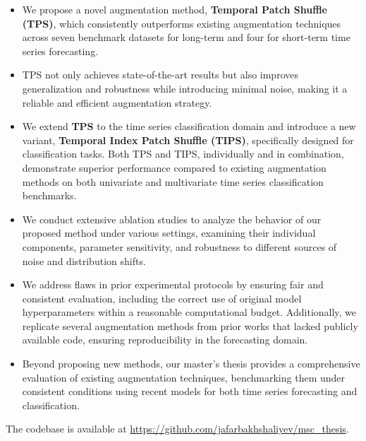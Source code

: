 \begin{itemize}
    \item We propose a novel augmentation method, \textbf{Temporal Patch Shuffle (TPS)}, which consistently outperforms existing augmentation techniques  across seven benchmark datasets for long-term and four for short-term time series forecasting.

    \item TPS not only achieves state-of-the-art results but also improves generalization and robustness while introducing minimal noise, making it a reliable and efficient augmentation strategy.

    \item We extend \textbf{TPS} to the time series classification domain and introduce a new variant, \textbf{Temporal Index Patch Shuffle (TIPS)}, specifically designed for classification tasks. Both TPS and TIPS, individually and in combination, demonstrate superior performance compared to existing augmentation methods on both univariate and multivariate time series classification benchmarks.

    \item We conduct extensive ablation studies to analyze the behavior of our proposed method under various settings, examining their individual components, parameter sensitivity, and robustness to different sources of noise and distribution shifts.

    \item We address flaws in prior experimental protocols by ensuring fair and consistent evaluation, including the correct use of original model hyperparameters within a reasonable computational budget. Additionally, we replicate several augmentation methods from prior works that lacked publicly available code, ensuring reproducibility in the forecasting domain.

    \item Beyond proposing new methods, our master's thesis provides a comprehensive evaluation of existing augmentation techniques, benchmarking them under consistent conditions using recent models for both time series forecasting and classification. 
\end{itemize}
The codebase is available at \url{https://github.com/jafarbakhshaliyev/msc_thesis}.













